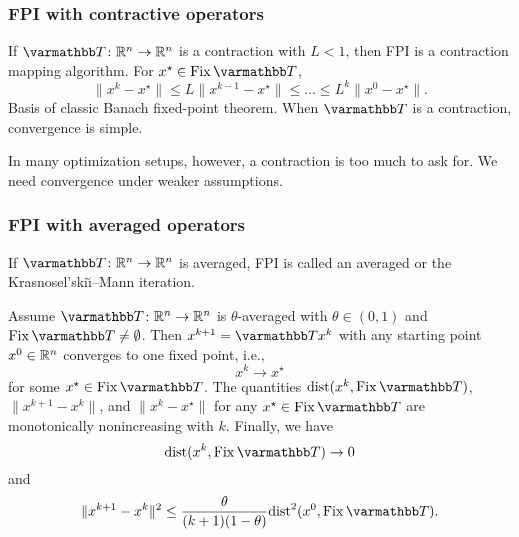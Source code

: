 \documentclass[10pt,mathserif]{beamer}
\begin{document}
\begin{frame}
\frametitle{FPI with contractive operators}
If $\opT \colon\reals^n \rightarrow \reals^n$ is a contraction with $L<1$, then FPI is a contraction mapping algorithm.
For $x^\star\in \fix \opT $,
\[
\|x^{k}-x^\star\|
\le
L\|x^{k-1}-x^\star\|
\le\dots
\le
L^k\|x^{0}-x^\star\|.
\]
Basis of classic Banach fixed-point theorem.
When $\opT $ is a contraction, convergence is simple.
\vspace{0.2in}



In many optimization setups, however, a contraction is too much to ask for.
We need convergence under weaker assumptions.
\end{frame}


\begin{frame}
\frametitle{FPI with averaged operators}
If $\opT \colon\reals^n\rightarrow\reals^n$ is averaged, FPI is called an averaged or the Krasnosel'ski\u{\i}--Mann iteration.
\begin{theorem}
Assume $\opT \colon\reals^n\rightarrow\reals^n$ is $\theta$-averaged with $\theta\in(0,1)$
and $\fix \opT \ne \emptyset$. Then
$x^{k+1}=\opT x^k$ with any starting point $x^0\in \mathbb{R}^n$
converges to one fixed point, i.e.,
\[
x^k\rightarrow x^\star
\]
 for some $x^\star\in \fix \opT $.
The quantities
$ \dist(x^{k},\fix \opT )$,
$\|x^{k+1}-x^k\|$,
and
$\|x^{k}-x^\star\|$  for any $x^\star\in \fix \opT $ are monotonically nonincreasing with $k$.
Finally, we have
\[
\dist(x^{k},\fix \opT )\rightarrow 0
\]
and
\[
\|x^{k+1}-x^k\|^2 \leq \frac{ \theta}
{(k+1) (1-\theta)}\dist^2(x^0,\fix \opT ).
\]
\vspace{-0.1in}
\end{theorem}
\end{frame}
\end{document}
